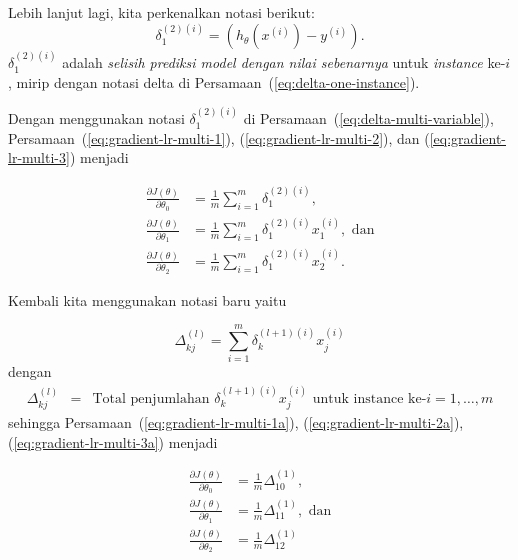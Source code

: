 \documentclass[12pt]{article}
\begin{document}
Lebih lanjut lagi, kita perkenalkan notasi berikut:
\begin{equation}
	\delta_1^{(2)(i)} = (h_\theta(x^{(i)}) - y^{(i)}).
	\label{eq:delta-multi-variable}	
\end{equation}
$\delta_1^{(2)(i)}$ adalah \textit{selisih prediksi model dengan nilai sebenarnya} untuk \textit{instance} ke-$i$, mirip dengan notasi delta di Persamaan~(\ref{eq:delta-one-instance}). 

Dengan menggunakan notasi $\delta_1^{(2)(i)}$ di Persamaan~(\ref{eq:delta-multi-variable}), Persamaan~(\ref{eq:gradient-lr-multi-1}), (\ref{eq:gradient-lr-multi-2}), dan (\ref{eq:gradient-lr-multi-3}) menjadi

\begin{align}
	\frac{\partial J(\theta)}{\partial \theta_0} &= \frac{1}{m} \sum_{i=1}^{m}{\delta_1^{(2)(i)}}, \label{eq:gradient-lr-multi-1a} \\
	\frac{\partial J(\theta)}{\partial \theta_1} &= \frac{1}{m} \sum_{i=1}^{m}{\delta_1^{(2)(i)} x_1^{(i)}}, \text{ dan} \label{eq:gradient-lr-multi-2a} \\	
	\frac{\partial J(\theta)}{\partial \theta_2} &= \frac{1}{m} \sum_{i=1}^{m}{\delta_1^{(2)(i)} x_2^{(i)}}. \label{eq:gradient-lr-multi-3a}	
\end{align}

Kembali kita menggunakan notasi baru yaitu 

\begin{equation}
\Delta_{kj}^{(l)} = \sum_{i=1}^{m}{\delta_k^{(l+1)(i)} x_j^{(i)}} 
\label{eq:persamaan-Delta}
\end{equation}
dengan
\begin{equation*}
\begin{array}{rcl}
	\Delta_{kj}^{(l)} & = & \text{Total penjumlahan }\delta_k^{(l+1)(i)} x_j^{(i)} \text{ untuk instance ke-}i=1, \ldots, m
\end{array}	
\end{equation*} 
sehingga Persamaan~(\ref{eq:gradient-lr-multi-1a}), (\ref{eq:gradient-lr-multi-2a}), (\ref{eq:gradient-lr-multi-3a}) menjadi 

\begin{align}
	\frac{\partial J(\theta)}{\partial \theta_0} &= \frac{1}{m} \Delta_{10}^{(1)}, \label{eq:gradient-lr-multi-1b} \\
	\frac{\partial J(\theta)}{\partial \theta_1} &= \frac{1}{m} \Delta_{11}^{(1)}, \text{ dan} \label{eq:gradient-lr-multi-2b} \\	
	\frac{\partial J(\theta)}{\partial \theta_2} &= \frac{1}{m} \Delta_{12}^{(1)}
	 \label{eq:gradient-lr-multi-3b}	
\end{align}
\end{document}
